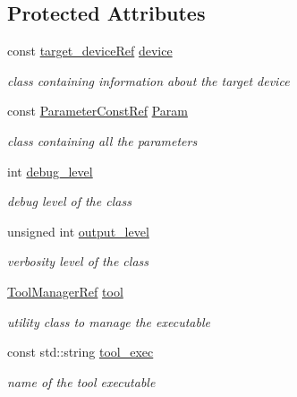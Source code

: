 \subsection*{Protected Attributes}
\begin{DoxyCompactItemize}
\item 
const \hyperlink{target__device_8hpp_acedb2b7a617e27e6354a8049fee44eda}{target\+\_\+device\+Ref} \hyperlink{classSynthesisTool_a07bf37421c6cff80ba70682ea2b2e3ae}{device}
\begin{DoxyCompactList}\small\item\em class containing information about the target device \end{DoxyCompactList}\item 
const \hyperlink{Parameter_8hpp_a37841774a6fcb479b597fdf8955eb4ea}{Parameter\+Const\+Ref} \hyperlink{classSynthesisTool_a854ef102782ff4d069e1aa6d1a94d64e}{Param}
\begin{DoxyCompactList}\small\item\em class containing all the parameters \end{DoxyCompactList}\item 
int \hyperlink{classSynthesisTool_a1b1a9cc667ea83558332386d5a0594a5}{debug\+\_\+level}
\begin{DoxyCompactList}\small\item\em debug level of the class \end{DoxyCompactList}\item 
unsigned int \hyperlink{classSynthesisTool_a58343bf9df295ca1734f28477c64373d}{output\+\_\+level}
\begin{DoxyCompactList}\small\item\em verbosity level of the class \end{DoxyCompactList}\item 
\hyperlink{ToolManager_8hpp_a785f6d5664e3a8bd974bc4afac02b73a}{Tool\+Manager\+Ref} \hyperlink{classSynthesisTool_a5da7778bdc9a72fc760f93f241da5ac5}{tool}
\begin{DoxyCompactList}\small\item\em utility class to manage the executable \end{DoxyCompactList}\item 
const std\+::string \hyperlink{classSynthesisTool_a78fd58496215c69838de4269204804a5}{tool\+\_\+exec}
\begin{DoxyCompactList}\small\item\em name of the tool executable \end{DoxyCompactList}\item 

\end{DoxyCompactItemize}
